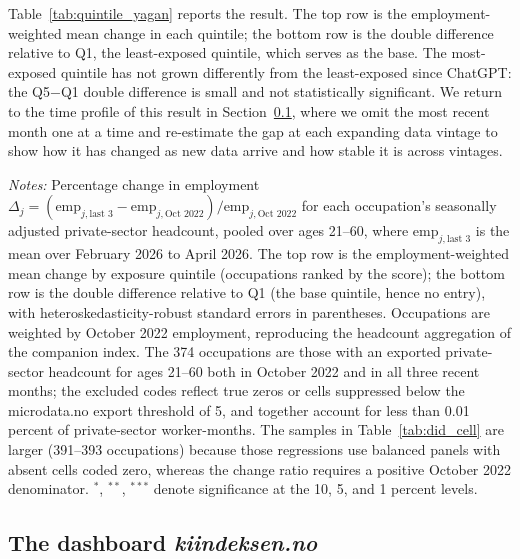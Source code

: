 \documentclass[12pt]{article}
\begin{document}
Table~\ref{tab:quintile_yagan} reports the result. The top row is the employment-weighted mean change in each quintile; the bottom row is the double difference relative to Q1, the least-exposed quintile, which serves as the base. The most-exposed quintile has not grown differently from the least-exposed since ChatGPT: the Q5$-$Q1 double difference is small and not statistically significant. We return to the time profile of this result in Section~\ref{sec:tracking:kiindeksen}, where we omit the most recent month one at a time and re-estimate the gap at each expanding data vintage to show how it has changed as new data arrive and how stable it is across vintages.

\begin{table}[tp]
  \centering
  \caption{Employment change by AI-exposure quintile: all ages 21--60, private sector.}
  \label{tab:quintile_yagan}
  
  \begin{minipage}{\textwidth}\footnotesize\textit{Notes:} Percentage change in employment $\Delta_j = (\text{emp}_{j,\text{last 3}}-\text{emp}_{j,\text{Oct }2022})/\text{emp}_{j,\text{Oct }2022}$ for each occupation's seasonally adjusted private-sector headcount, pooled over ages 21--60, where $\text{emp}_{j,\text{last 3}}$ is the mean over February 2026 to April 2026. The top row is the employment-weighted mean change by exposure quintile (occupations ranked by the \citet{eloundou2024} score); the bottom row is the double difference relative to Q1 (the base quintile, hence no entry), with heteroskedasticity-robust standard errors in parentheses. Occupations are weighted by October 2022 employment, reproducing the headcount aggregation of the companion index. The 374 occupations are those with an exported private-sector headcount for ages 21--60 both in October 2022 and in all three recent months; the excluded codes reflect true zeros or cells suppressed below the microdata.no export threshold of 5, and together account for less than 0.01 percent of private-sector worker-months. The samples in Table~\ref{tab:did_cell} are larger (391--393 occupations) because those regressions use balanced panels with absent cells coded zero, whereas the change ratio requires a positive October 2022 denominator. $^{*}$, $^{**}$, $^{***}$ denote significance at the 10, 5, and 1 percent levels.\end{minipage}
\end{table}

\subsection{The dashboard \emph{kiindeksen.no}}\label{sec:tracking:kiindeksen}
\end{document}
